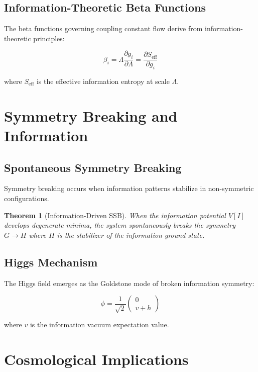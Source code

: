 \documentclass[12pt,a4paper]{article}
\newtheorem{theorem}{Theorem}[section]
\begin{document}
\subsection{Information-Theoretic Beta Functions}

The beta functions governing coupling constant flow derive from information-theoretic principles:

\begin{equation}
\beta_i = \Lambda \frac{\partial g_i}{\partial \Lambda} = \frac{\partial S_{\text{eff}}}{\partial g_i}
\end{equation}

where $S_{\text{eff}}$ is the effective information entropy at scale $\Lambda$.

\section{Symmetry Breaking and Information}

\subsection{Spontaneous Symmetry Breaking}

Symmetry breaking occurs when information patterns stabilize in non-symmetric configurations.

\begin{theorem}[Information-Driven SSB]
When the information potential $V[I]$ develops degenerate minima, the system spontaneously breaks the symmetry $G \to H$ where $H$ is the stabilizer of the information ground state.
\end{theorem}

\subsection{Higgs Mechanism}

The Higgs field emerges as the Goldstone mode of broken information symmetry:

\begin{equation}
\phi = \frac{1}{\sqrt{2}} \begin{pmatrix} 0 \\ v + h \end{pmatrix}
\end{equation}

where $v$ is the information vacuum expectation value.

\section{Cosmological Implications}
\end{document}
